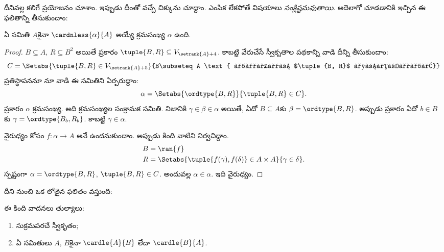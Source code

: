 \documentclass[../../../include/open-logic-section]{subfiles}
\begin{document}

దీనివల్ల కలిగే ప్రయోజనం చూశాం. ఇప్పుడు
దీంతో వచ్చే చిక్కును చూద్దాం. ఎంపిక లేకపోతే విషయాలు
\emph{సంక్లిష్టమవుతాయి}. అదెలాగో చూడడానికి
\cite{Hartogs1915} ఇచ్చిన ఈ ఫలితాన్ని తీసుకుందాం:

\begin{lem}[\emph{$\ZF$లో}]
ఏ సమితి $A$కైనా $\cardnless{\alpha}{A}$ అయ్యే క్రమసంఖ్య $\alpha$ ఉంది.
\end{lem}

\begin{proof}
$B \subseteq A$, $R \subseteq B^2$ అయితే  ప్రకారం $\tuple{B, R} \subseteq
V_{\setrank{A}+4}$. కాబట్టి వేరుచేసే స్వీకృతాల పథకాన్ని వాడి దీన్ని తీసుకుందాం:
\[
	C = \Setabs{\tuple{B, R} \in V_{\setrank{A}+5}}{B\subseteq A 
	\text{ మరియు $\tuple{B, R}$ సుక్రమం}}
\]
ప్రతిస్థాపననూ నూ వాడి ఈ సమితిని ఏర్పరుద్దాం:
\[
	\alpha = \Setabs{\ordtype{B, R}}{\tuple{B, R} \in C}.
\]
 ప్రకారం
$\alpha$ క్రమసంఖ్య. అది క్రమసంఖ్యల సంక్రామక
సమితి. నిజానికి $\gamma \in \beta \in \alpha$ అయితే,
ఏదో $B \subseteq A$కు $\beta = \ordtype{B, R}$.
అప్పుడు  ప్రకారం
ఏదో $b \in B$కు $\gamma = \ordtype{B_b, R_b}$.
కాబట్టి $\gamma \in \alpha$.

వైరుధ్యం కోసం $f \colon \alpha \to A$ అనే  ఉందనుకుందాం. అప్పుడు కింది వాటిని నిర్వచిద్దాం.
\begin{align*}
	B &= \ran{f}\\
	R &= \Setabs{\tuple{f(\gamma), f(\delta)} \in A \times A}{\gamma \in \delta}.
\end{align*}
స్పష్టంగా $\alpha = \ordtype{B, R}$, $\tuple{B, R} \in C$. అందువల్ల $\alpha
\in \alpha$. ఇది వైరుధ్యం.
\end{proof}

దీని నుంచి ఒక లోతైన ఫలితం వస్తుంది:

\begin{thm}[\emph{$\ZF$లో}]
ఈ కింది వాదనలు తుల్యాలు:
\begin{enumerate}
	\item{} సుక్రమపరచే స్వీకృతం;
	\item{} ఏ సమితులు $A$, $B$కైనా $\cardle{A}{B}$ లేదా $\cardle{B}{A}$.
\end{enumerate}
\end{thm}
\end{document}
